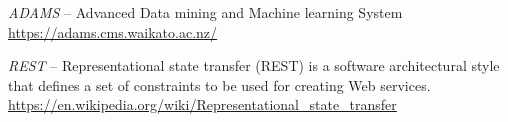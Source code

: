 %

\begin{thebibliography}{999}

		\textit{ADAMS} -- Advanced Data mining and Machine learning System \\
		\url{https://adams.cms.waikato.ac.nz/}{}

		\textit{REST} -- Representational state transfer (REST) is a software
		architectural style that defines a set of constraints to be used
		for creating Web services. \\
		\url{https://en.wikipedia.org/wiki/Representational_state_transfer}{}

\end{thebibliography}
